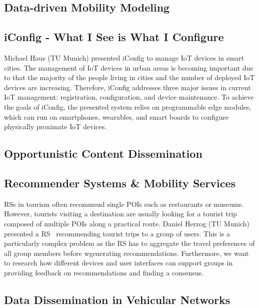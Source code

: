 \subsection{Data-driven Mobility Modeling}

\subsection{iConfig - What I See is What I Configure}

Michael Haus (TU Munich) presented iConfig to manage \ac{IoT} devices in smart
cities. The management of \ac{IoT} devices in urban areas is becoming
important due to that the majority of the people living in cities and the
number of deployed \ac{IoT} devices are increasing. Therefore, iConfig
addresses three major issues in current \ac{IoT} management: registration,
configuration, and device maintenance. To achieve the goals of iConfig, the
presented system relies on programmable edge modules, which can run on
smartphones, wearables, and smart boards to configure physically proximate
\ac{IoT} devices.


\subsection{Opportunistic Content Dissemination}


\subsection{Recommender Systems \& Mobility Services}

\ac{RSs} in tourism often recommend single \ac{POIs} such as restaurants or
museums. However, tourists visiting a destination are usually looking for a
tourist trip composed of multiple \ac{POIs} along a practical route. Daniel
Herzog (TU Munich) presented a \ac{RS}~\cite{dherzog:it:2017} recommending
tourist trips to a group of users.  This is a particularly complex problem as
the \ac{RS} has to aggregate the travel preferences of all group members
before wgenerating recommendations.  Furthermore, we want to research how
different devices and user interfaces can support groups in providing feedback
on recommendations and finding a consensus.

\subsection{Data Dissemination in Vehicular Networks}

